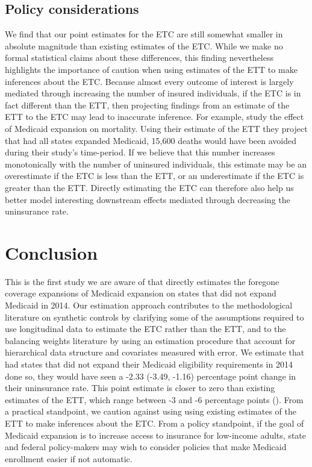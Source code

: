 \subsection{Policy considerations}

We find that our point estimates for the ETC are still somewhat smaller in absolute magnitude than existing estimates of the ETC. While we make no formal statistical claims about these differences, this finding nevertheless highlights the importance of caution when using estimates of the ETT to make inferences about the ETC. Because almost every outcome of interest is largely mediated through increasing the number of insured individuals, if the ETC is in fact different than the ETT, then projecting findings from an estimate of the ETT to the ETC may lead to inaccurate inference. For example, \cite{miller2019medicaid} study the effect of Medicaid expansion on mortality. Using their estimate of the ETT they project that had all states expanded Medicaid, 15,600 deaths would have been avoided during their study's time-period. If we believe that this number increases monotonically with the number of uninsured individuals, this estimate may be an overestimate if the ETC is less than the ETT, or an underestimate if the ETC is greater than the ETT. Directly estimating the ETC can therefore also help us better model interesting downstream effects mediated through decreasing the uninsurance rate. 

\section{Conclusion}

This is the first study we are aware of that directly estimates the foregone coverage expansions of Medicaid expansion on states that did not expand Medicaid in 2014. Our estimation approach contributes to the methodological literature on synthetic controls by clarifying some of the assumptions required to use longitudinal data to estimate the ETC rather than the ETT, and to the balancing weights literature by using an estimation procedure that account for hierarchical data structure and covariates measured with error. We estimate that had states that did not expand their Medicaid eligibility requirements in 2014 done so, they would have seen a -2.33 (-3.49, -1.16) percentage point change in their uninsurance rate. This point estimate is closer to zero than existing estimates of the ETT, which range between -3 and -6 percentage points (\cite{frean2017premium}). From a practical standpoint, we caution against using using existing estimates of the ETT to make inferences about the ETC. From a policy standpoint, if the goal of Medicaid expansion is to increase access to insurance for low-income adults, state and federal policy-makers may wish to consider policies that make Medicaid enrollment easier if not automatic.

